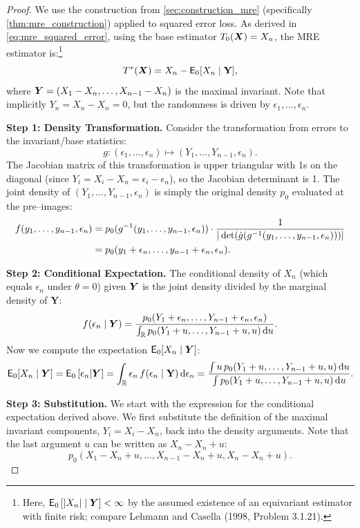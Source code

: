 \begin{proof}
We use the construction from \autoref{sec:construction_mre} (specifically \autoref{thm:mre_construction}) applied to squared error loss. As derived in \eqref{eq:mre_squared_error}, using the base estimator \(T_0(\boldsymbol{X}) = X_n\), the MRE estimator is:\footnote{Here, \(\mathsf{E}_{0}\left[|X_{n}| \mid \boldsymbol{Y}\right] < \infty\) by the assumed existence of an equivariant estimator with finite risk; compare Lehmann and Casella (1998, Problem 3.1.21).} 
\[
T^*(\boldsymbol{X}) = X_n - \mathsf{E}_0[X_n \mid \mathbf{Y}],
\]
where \(\boldsymbol{Y} = (X_1 - X_n, \dots, X_{n-1} - X_n)\) is the maximal invariant. Note that implicitly \(Y_n = X_{n} - X_{n}= 0\), but the randomness is driven by \(\epsilon_1, \dots, \epsilon_n\).

\textbf{Step 1: Density Transformation.}
Consider the transformation from errors to the invariant/base statistics:
\[
g: (\epsilon_1, \dots, \epsilon_n) \mapsto (Y_1, \dots, Y_{n-1}, \epsilon_n).
\]
The Jacobian matrix of this transformation is upper triangular with 1s on the diagonal (since \(Y_i = X_{i}-X_{n}= \epsilon_i - \epsilon_n\)), so the Jacobian determinant is 1. The joint density of \((Y_1, ..., Y_{n-1}, \epsilon_n)\) is simply the original density \(p_0\) evaluated at the pre--images:
\begin{align*}
    f(y_1, \dots, y_{n-1}, \epsilon_n) 
    &= p_0(g^{-1}(y_{1}, \dots, y_{n-1},\epsilon_{n})) \cdot \frac{1}{|\det(\dot{g}(g^{-1}(y_{1}, \dots, y_{n-1},\epsilon_{n})))|}\\
    &= p_0(y_1 + \epsilon_n, \dots, y_{n-1} + \epsilon_n, \epsilon_n).
\end{align*}

\textbf{Step 2: Conditional Expectation.}
The conditional density of \(X_n\) (which equals \(\epsilon_n\) under \(\theta=0\)) given \(\boldsymbol{Y}\) is the joint density divided by the marginal density of \(\mathbf{Y}\):
\[
f(\epsilon_n \mid \boldsymbol{Y}) = \frac{p_0(Y_1 + \epsilon_n, \dots, Y_{n-1} + \epsilon_n, \epsilon_n)}{\int_{\mathbb{R}} p_0(Y_1 + u, \dots, Y_{n-1} + u, u) \, \mathrm{d}u}.
\]
Now we compute the expectation \(\mathsf{E}_0[X_n \mid \boldsymbol{Y}]\):
\[
\mathsf{E}_0[X_n \mid \boldsymbol{Y}] = \mathsf{E}_{0}\left[\epsilon_{n}|\boldsymbol{Y}\right] = \int_{\mathbb{R}} \epsilon_n \, f(\epsilon_n \mid \mathbf{Y}) \, \mathrm{d}\epsilon_n = \frac{\int u \, p_0(Y_1 + u, \dots, Y_{n-1} + u, u) \, \mathrm{d}u}{\int p_0(Y_1 + u, \dots, Y_{n-1} + u, u) \, \mathrm{d}u}.
\]

\textbf{Step 3: Substitution.}
We start with the expression for the conditional expectation derived above. We first substitute the definition of the maximal invariant components, \(Y_i = X_i - X_n\), back into the density arguments. Note that the last argument \(u\) can be written as \(X_n - X_n + u\):
\[
p_0(X_1 - X_n + u, \dots, X_{n-1} - X_n + u, X_n - X_n + u).
\]


\end{proof}
